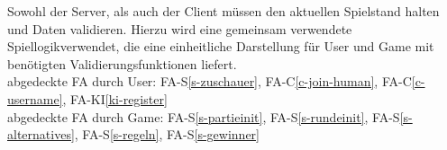 Sowohl der Server, als auch der Client müssen den aktuellen Spielstand halten und Daten validieren. Hierzu wird eine gemeinsam verwendete \glqq Spiellogik\grqq verwendet, die eine einheitliche Darstellung für User und Game mit benötigten Validierungsfunktionen liefert.\\
abgedeckte FA durch User: FA-S\ref{s-zuschauer}, FA-C\ref{c-join-human}, FA-C\ref{c-username}, FA-KI\ref{ki-register}\\
abgedeckte FA durch Game: FA-S\ref{s-partieinit}, FA-S\ref{s-rundeinit}, FA-S\ref{s-alternatives}, FA-S\ref{s-regeln}, FA-S\ref{s-gewinner}\\



